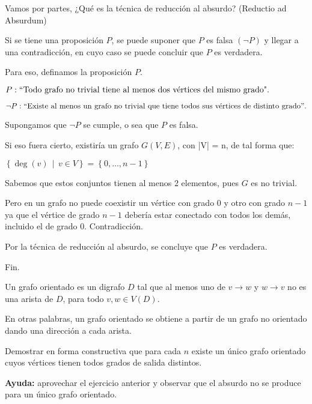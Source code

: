 \documentclass[12pt,a4paper]{article}
\begin{document}
\demoline

\par Vamos por partes, ¿Qué es la técnica de reducción al absurdo? (Reductio ad Absurdum)
\par Si se tiene una proposición \ensuremath{P}, se puede suponer que \ensuremath{P} es falsa \ensuremath{(\neg P)} y llegar a una contradicción, en cuyo caso se puede concluir que \ensuremath{P} es verdadera.

\demoline
\par Para eso, definamos la proposición \ensuremath{P}.
\par \ensuremath{P: ``\text{Todo grafo no trivial tiene al menos dos vértices del mismo grado".}}
\par \ensuremath{\neg P: ``\text{Existe al menos un grafo no trivial que tiene todos sus vértices de distinto grado}".}
\par Supongamos que \ensuremath{\neg P} se cumple, o sea que \ensuremath{P} es falsa.
\par Si eso fuera cierto, existiría un grafo \ensuremath{G(V, E)}, con |V| = n, de tal forma que:
\par 
  \ensuremath{
  \left\{ \deg(v) \,\middle|\, v \in V \right\} = \left\{0, \dots, n-1 \right\}
  }
\par Sabemos que estos conjuntos tienen al menos 2 elementos, pues \ensuremath{G} es no trivial.

\demoline

\par Pero en un grafo no puede coexistir un vértice con grado 0 y otro con grado \ensuremath{n-1}
ya que el vértice de grado \ensuremath{n-1}
debería estar conectado con todos los demás, incluido el de grado 0. Contradicción.

\demoline

\par Por la técnica de reducción al absurdo, se concluye que \ensuremath{P} es verdadera.

\demoline
\demoline

\par Fin.

\newpage


\par Un grafo orientado es un digrafo \ensuremath{D} tal que al menos uno de \ensuremath{v \rightarrow w} y \ensuremath{w \rightarrow v} no es una arista de \ensuremath{D}, para todo \ensuremath{v, w \in V(D)}.
\par En otras palabras, un grafo orientado se obtiene a partir de un grafo no orientado dando una dirección a cada arista.
\par Demostrar en forma constructiva que para cada \ensuremath{n} existe un único grafo orientado cuyos vértices tienen todos grados de salida distintos.
\par \textbf{Ayuda:} aprovechar el ejercicio anterior y observar que el absurdo no se produce para un único grafo orientado.
\end{document}
